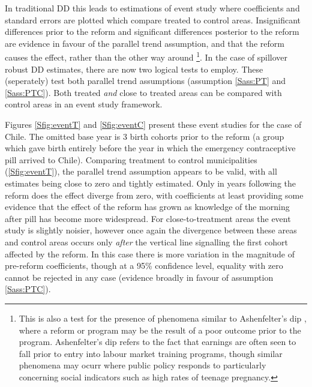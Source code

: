 In traditional DD this leads to estimations of event study where coefficients
and standard errors are plotted which compare treated to control areas.  
Insignificant differences prior to the reform and significant differences 
posterior to the reform are evidence in favour of the parallel trend assumption,
and that the reform causes the effect, rather than the other way around%
\footnote{This is also a test for the presence of phenomena similar to 
Ashenfelter's dip \citep{Ashenfelter1978,HeckmanSmith1999}, where a reform or 
program may be the result of a poor outcome prior to the program.  Ashenfelter's 
dip refers to the fact that earnings are often seen to fall prior to entry into 
labour market training programs, though similar phenomena may ocurr where public 
policy responds to particularly concerning social indicators such as high rates 
of teenage pregnancy.}. In the case of spillover robust DD estimates, there are 
now two logical tests to employ.  These (seperately) test both parallel trend 
assumptions (assumption \ref{Sass:PT} and \ref{Sass:PTC}). Both treated 
\emph{and} close to treated areas can be compared with control areas in an event 
study framework.  

Figures \ref{Sfig:eventT} and \ref{Sfig:eventC} present these event studies for
the case of Chile.  The omitted base year is 3 birth cohorts prior to the reform
(a group which gave birth entirely before the year in which the emergency 
contraceptive pill arrived to Chile).  Comparing treatment to control 
municipalities (\ref{Sfig:eventT}), the parallel trend assumption appears to
be valid, with all estimates being close to zero and tightly estimated.  Only
in years following the reform does the effect diverge from zero, with 
coefficients at least providing some evidence that the effect of the reform has
grown as knowledge of the morning after pill has become more widespread.  For 
close-to-treatment areas the event study is slightly noisier, however once again 
the divergence between these areas and control areas occurs only \emph{after}
the vertical line signalling the first cohort affected by the reform. In this
case there is more variation in the magnitude of pre-reform coefficients, though
at a 95\% confidence level, equality with zero cannot be rejected in any case 
(evidence broadly in favour of assumption \ref{Sass:PTC}).

